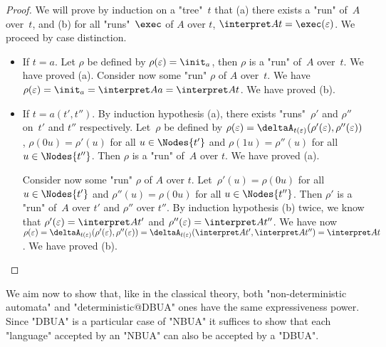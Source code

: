 \documentclass[a4paper,UKenglish,cleveref, autoref, thm-restate]{lipics-v2021}
\begin{document}
\begin{proof}
	We will prove by induction on a "tree"~$t$ that (a) there exists a "run" of~$A$ over~$t$, and (b) for all "runs"~$\exec$ of $A$ over $t$, $\interpret A t = \exec (\varepsilon)$.
	We proceed by case distinction.
	\begin{itemize}
		\item If $t = a$. Let $\rho$ be defined by $\rho(\varepsilon)=\init_a$, then $\rho$ is a "run" of~$A$ over~$t$. We have proved (a).
		      Consider now some "run" $\rho$ of $A$ over~$t$. We have $\rho(\varepsilon)=\init_a=\interpret A a=\interpret A t$. We have proved  (b).

		\item If $t = a(t',t'')$. By induction hypothesis (a), there exists "runs"~$\rho'$ and $\rho''$ on~$t'$ and $t''$ respectively.
		      Let~$\rho$ be defined by $\rho(\varepsilon)=\deltaA_{t(\varepsilon)}(\rho'(\varepsilon),\rho''(\varepsilon))$,
		      $\rho(0u)=\rho'(u)$ for all $u\in\Nodes{t'}$ and $\rho(1u)=\rho''(u)$ for all~$u\in \Nodes{t''}$. Then $\rho$ is a "run" of~$A$ over $t$. We have proved (a).

		      Consider now some "run" $\rho$ of $A$ over $t$. Let~$\rho'(u)=\rho(0u)$ for all $u \in \Nodes {t'}$ and $\rho''(u)=\rho(0u)$ for all $u \in \Nodes {t''}$.
		      Then $\rho'$ is a "run" of~$A$ over $t'$ and $\rho''$ over $t''$. By induction hypothesis (b) twice, we know that $\rho'(\varepsilon)=\interpret A {t'}$ and $\rho''(\varepsilon)=\interpret A {t''}$.
		      We have now $\rho(\varepsilon) = \deltaA_{t(\varepsilon)}(\rho'(\varepsilon),\rho''(\varepsilon)) = \deltaA_{t(\varepsilon)}(\interpret A {t'},\interpret A {t''}) = \interpret A t$. We have proved (b).
	\end{itemize}
\end{proof}


We aim now to show that, like in the classical theory, both "non-deterministic automata" and "deterministic@DBUA" ones have the same expressiveness power.
Since "DBUA" is a particular case of "NBUA" it suffices to show that each "language" accepted by an "NBUA" can also be accepted by a "DBUA".
\end{document}
